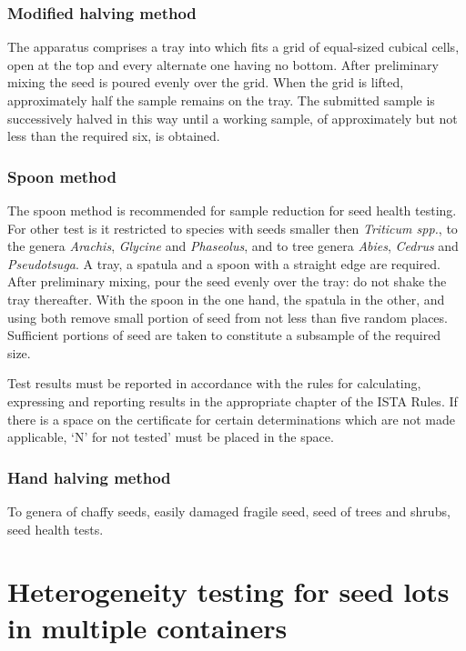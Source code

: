 \documentclass[
]{book}
\begin{document}
\hypertarget{modified-halving-method}{%
\subsubsection{Modified halving method}\label{modified-halving-method}}

The apparatus comprises a tray into which fits a grid of equal-sized cubical cells, open at the top and every alternate one having no bottom. After preliminary mixing the seed is poured evenly over the grid. When the grid is lifted, approximately half the sample remains on the tray. The submitted sample is successively halved in this way until a working sample, of approximately but not less than the required six, is obtained.

\hypertarget{spoon-method}{%
\subsubsection{Spoon method}\label{spoon-method}}

The spoon method is recommended for sample reduction for seed health testing. For other test is it restricted to species with seeds smaller then \emph{Triticum spp.}, to the genera \emph{Arachis}, \emph{Glycine} and \emph{Phaseolus}, and to tree genera \emph{Abies}, \emph{Cedrus} and \emph{Pseudotsuga}. A tray, a spatula and a spoon with a straight edge are required. After preliminary mixing, pour the seed evenly over the tray: do not shake the tray thereafter. With the spoon in the one hand, the spatula in the other, and using both remove small portion of seed from not less than five random places. Sufficient portions of seed are taken to constitute a subsample of the required size.

Test results must be reported in accordance with the rules for calculating, expressing and reporting results in the appropriate chapter of the ISTA Rules. If there is a space on the certificate for certain determinations which are not made applicable, `N' for not tested' must be placed in the space.

\hypertarget{hand-halving-method}{%
\subsubsection{Hand halving method}\label{hand-halving-method}}

To genera of chaffy seeds, easily damaged fragile seed, seed of trees and shrubs, seed health tests.

\hypertarget{heterogeneity-testing-for-seed-lots-in-multiple-containers}{%
\section{Heterogeneity testing for seed lots in multiple containers}\label{heterogeneity-testing-for-seed-lots-in-multiple-containers}}
\end{document}
